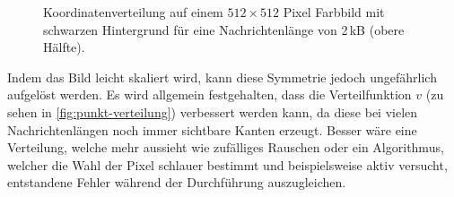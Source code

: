 \begin{figure}[h!]
  \centering
  \caption{Koordinatenverteilung auf einem $512 \times 512$ Pixel Farbbild mit
    schwarzen Hintergrund für eine Nachrichtenlänge von 2\,kB (obere Hälfte).}
  \label{fig:example-white-stripes}
\end{figure}

\noindent
Indem das Bild leicht skaliert wird, kann diese Symmetrie jedoch ungefährlich aufgelöst
werden. Es wird allgemein festgehalten, dass die Verteilfunktion $v$
(zu sehen in \autoref{fig:punkt-verteilung})
verbessert werden kann, da diese bei vielen Nachrichtenlängen noch immer
sichtbare Kanten erzeugt. Besser wäre eine Verteilung, welche mehr aussieht wie
zufälliges Rauschen oder ein Algorithmus, welcher die Wahl der Pixel schlauer
bestimmt und beispielsweise aktiv versucht, entstandene Fehler während
der Durchführung auszugleichen.
